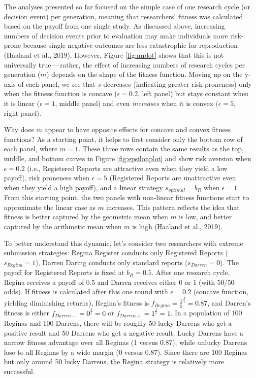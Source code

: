 \documentclass[
  ,man,mask,floatsintext]{apa6}
\begin{document}
The analyses presented so far focused on the simple case of one research cycle (or decision event) per generation, meaning that researchers' fitness was calculated based on the payoff from one single study.
As discussed above, increasing numbers of decision events prior to evaluation may make individuals more risk-prone because single negative outcomes are less catastrophic for reproduction (Haaland et al., 2019).
However, Figure \ref{fig:mplot} shows that this is not universally true\(\,\)---\(\,\)rather, the effect of increasing numbers of research cycles per generation (\(m\)) depends on the shape of the fitness function.
Moving up on the y-axis of each panel, we see that \(s\) decreases (indicating greater risk proneness) only when the fitness function is concave (\(\epsilon = 0.2\), left panel) but stays constant when it is linear (\(\epsilon = 1\), middle panel) and even \emph{increases} when it is convex (\(\epsilon = 5\), right panel).

Why does \(m\) appear to have opposite effects for concave and convex fitness functions?
As a starting point, it helps to first consider only the bottom row of each panel, where \(m = 1\).
These three rows contain the same results as the top, middle, and bottom curves in Figure \ref{fig:epsilonplot} and show risk aversion when \(\epsilon = 0.2\) (i.e., Registered Reports are attractive even when they yield a low payoff), risk proneness when \(\epsilon = 5\) (Registered Reports are unattractive even when they yield a high payoff), and a linear strategy \(s_{optimal} = b_{R}\) when \(\epsilon = 1\).
From this starting point, the two panels with non-linear fitness functions start to approximate the linear case as \(m\) increases.
This pattern reflects the idea that fitness is better captured by the geometric mean when \(m\) is low, and better captured by the arithmetic mean when \(m\) is high (Haaland et al., 2019).

To better understand this dynamic, let's consider two researchers with extreme submission strategies:
Regina Register conducts only Registered Reports (\(s_{Regina} = 1\)), Darren Daring conducts only standard reports (\(s_{Darren} = 0\)).
The payoff for Registered Reports is fixed at \(b_{R} = 0.5\).
After one research cycle, Regina receives a payoff of 0.5 and Darren receives either 0 or 1 (with 50/50 odds).
If fitness is calculated after this one round with \(\epsilon = 0.2\) (concave function, yielding diminishing returns), Regina's fitness is \(f_{Regina} = \frac{1}{2}^{\frac{1}{5}} = 0.87\), and Darren's fitness is either \(f_{Darren-} = 0^{\frac{1}{5}} = 0\) or \(f_{Darren+} = 1^{\frac{1}{5}} = 1\).
In a population of 100 Reginas and 100 Darrens, there will be roughly 50 lucky Darrens who get a positive result and 50 Darrens who get a negative result.
Lucky Darrens have a narrow fitness advantage over all Reginas (1 versus 0.87), while unlucky Darrens lose to all Reginas by a wide margin (0 versus 0.87).
Since there are 100 Reginas but only around 50 lucky Darrens, the Regina strategy is relatively more successful.
\end{document}
